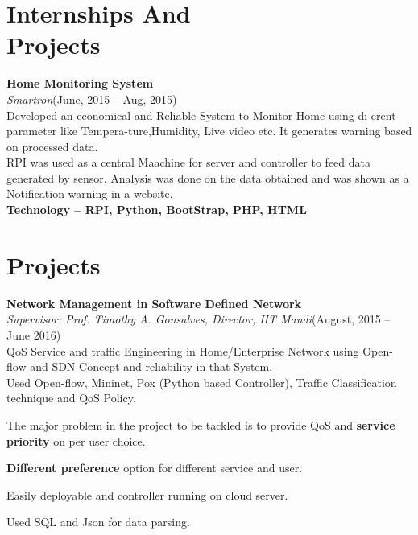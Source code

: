 \documentclass[a4paper,margin,line]{resume}
\begin{document}
\begin{resume}
	\section{\mysidestyle Internships And\\Projects}

	\textbf{Home Monitoring System}\vspace{0.5mm}\\
	\textsl{Smartron}\hfill(June, 2015 -- Aug, 2015)\vspace{1mm}\\
	Developed an economical and Reliable System to Monitor Home using di erent parameter like Tempera-ture,Humidity, Live video etc. It generates warning based on processed data.\\
	RPI was used as a central Maachine for server and controller to feed data generated by sensor.
Analysis was done on the data obtained and was shown as a Notification warning in a website.\\
\textbf{Technology – RPI, Python, BootStrap, PHP, HTML}

	
\section{\mysidestyle Projects}
	\textbf{Network Management in Software Defined Network}\vspace{0.5mm}\\%
	\textsl{Supervisor: Prof. Timothy A. Gonsalves, Director, IIT Mandi}\hfill(August, 2015 -- June 2016)\vspace{1mm}\\%
	QoS Service and traffic Engineering in Home/Enterprise Network using Open-flow and SDN Concept and  reliability in that System.\\  Used Open-flow,  Mininet,  Pox  (Python based Controller),  Traffic  Classification  technique  and  QoS Policy.	
	\begin{list2}
	\item The major problem in the project to be tackled is to provide QoS and \textbf{service priority} on per user choice.
	\item \textbf{Different preference} option for different service and user.
	\item Easily deployable and controller running on cloud  server.
	\item Used SQL and Json for data parsing.
	\end{list2}	


\end{resume}
\end{document}
